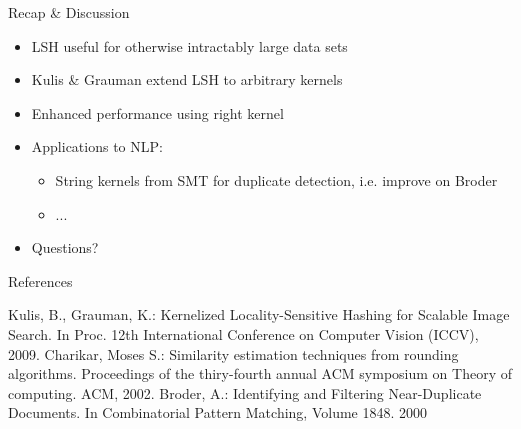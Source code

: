 \documentclass[12pt,a4paper]{beamer}
\begin{document}
\begin{frame}{Recap \& Discussion}
\begin{itemize}
\item LSH useful for otherwise intractably large data sets
\item Kulis \& Grauman extend LSH to arbitrary kernels
\item Enhanced performance using right kernel
\item Applications to NLP:
\begin{itemize}
    \item String kernels from SMT for duplicate detection, i.e. improve on Broder \cite{broder}
    \item ...
\end{itemize}
\item Questions?
\end{itemize}
\end{frame}


\begin{frame}{References}
\begin{thebibliography}{-}
 Kulis, B., Grauman, K.: Kernelized Locality-Sensitive Hashing for Scalable Image Search.
In Proc. 12th International Conference on Computer Vision (ICCV), 2009.
 Charikar, Moses S.: Similarity estimation techniques from rounding algorithms. Proceedings of the thiry-fourth annual ACM symposium on Theory of computing. ACM, 2002.
 Broder, A.: Identifying and Filtering Near-Duplicate Documents. In Combinatorial Pattern Matching, Volume 1848. 2000



\end{thebibliography}
\end{frame}
\end{document}
